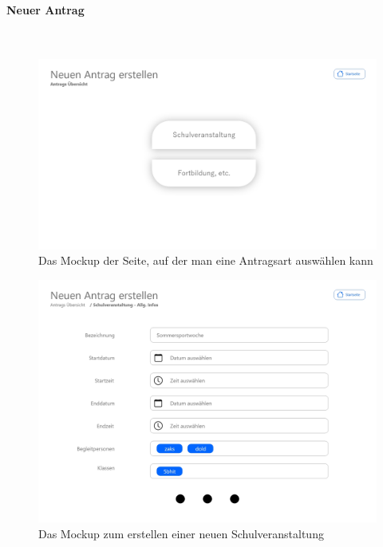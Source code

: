 \paragraph{Neuer Antrag}
~\\

\begin{figure}[H]
	\centering
	\includegraphics[width=1\linewidth]{images/Mockup-Neuer-Antrag}
	\caption[Mockup neuer Antrag]{Das Mockup der Seite, auf der man eine Antragsart auswählen kann}
	\label{fig:mockupNeu}
\end{figure}
\begin{figure}[H]
	\centering
	\includegraphics[width=1\linewidth]{images/Mockup-Antrag-erstellen}
	\caption[Mockup Antrag erstellen]{Das Mockup zum erstellen einer neuen Schulveranstaltung}
	\label{fig:mockupErstellen}
\end{figure}
